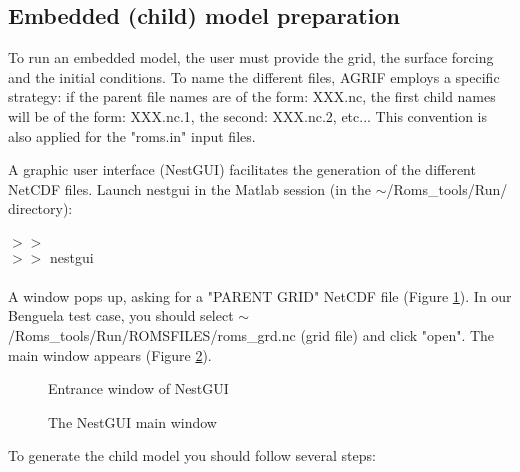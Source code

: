 \subsection{Embedded (child) model preparation}

To run an embedded model, the user must provide the grid, the surface 
forcing and the initial conditions. To name the different files,
AGRIF employs a specific strategy: if the parent file names are of
the form: XXX.nc, the first child names will be of the form: 
XXX.nc.1, the second: XXX.nc.2, etc... 
This convention is also applied for the "roms.in" input files.

A graphic user interface (NestGUI) facilitates the generation of 
the different NetCDF files. Launch nestgui in the Matlab session 
(in the $\sim$/Roms\_tools/Run/ directory):
\\ \\
$>>$\\
$>>$ nestgui
\\ \\
A window pops up, asking for a "PARENT GRID" NetCDF file 
(Figure \ref{fig:nestgui1}). In our Benguela test case, you should select 
$\sim$/Roms\_tools/Run/ROMSFILES/roms\_grd.nc (grid file) and click "open".
The main window appears (Figure \ref{fig:nestgui2}).

\begin{figure}[!ht]
\centerline{}
\caption{Entrance window of NestGUI}
\label{fig:nestgui1}
\end{figure}
 
\begin{figure}[!ht]
\centerline{}
\caption{The NestGUI main window}
\label{fig:nestgui2}
\end{figure}

To generate the child model you should follow several steps:

